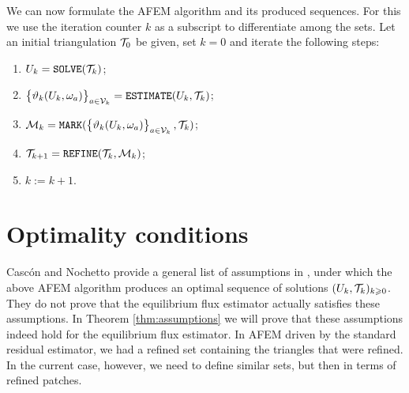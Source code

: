 \documentclass[thesis.tex]{subfiles}
\begin{document}
We can now formulate the AFEM algorithm and its produced sequences. For this we use the
iteration counter $k$ as a subscript to differentiate among the sets.
Let an initial triangulation $\mathcal{T}_0$ be given, set $k = 0$ and iterate the following steps:
\begin{enumerate}
\item $U_k = \texttt{SOLVE}(\mathcal{T}_k)$;
\item $\set{\vartheta_k(U_k, \omega_a)}_{a \in \mathcal{V}_k} = \texttt{ESTIMATE}(U_k, \mathcal{T}_k)$;
  \item $\mathcal{M}_k = \texttt{MARK}(\set{\vartheta_k(U_k, \omega_a)}_{a \in \mathcal{V}_k}, \mathcal{T}_k)$;
  \item $\mathcal{T}_{k+1} = \texttt{REFINE}(\mathcal{T}_k, \mathcal{M}_k)$;
  \item $k  := k + 1$.
\end{enumerate}

\section{Optimality conditions}
Casc\'on and Nochetto provide a general list of assumptions in \cite[\S 4]{cascon2012}, under which the above AFEM algorithm produces
an optimal sequence of solutions $(U_k, \mathcal{T}_k)_{k \geqslant 0}$.
They do not prove that the equilibrium flux estimator actually  satisfies these assumptions.
In Theorem \ref{thm:assumptions} we will prove that these
assumptions indeed hold for the equilibrium flux estimator.
In AFEM driven by the standard residual estimator, we had a refined set containing the triangles that were refined.
In the current case, however, we need to define similar sets, but then in terms of refined patches.
\end{document}
